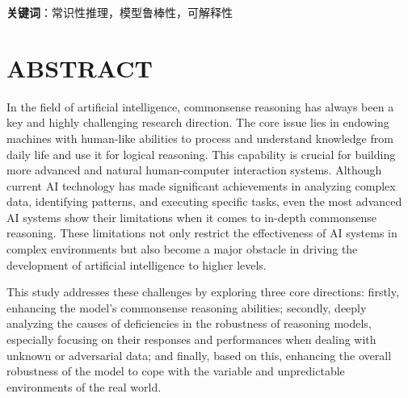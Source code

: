 \documentclass[UTF8,a4paper,12pt]{ctexart}
\numberwithin{equation}{section}
\begin{document}
\textbf{关键词}：常识性推理，模型鲁棒性，可解释性\\

\newpage


\section*{ABSTRACT}

\hspace{8mm}
In the field of artificial intelligence, commonsense reasoning has always been a key and highly challenging research direction. The core issue lies in endowing machines with human-like abilities to process and understand knowledge from daily life and use it for logical reasoning. This capability is crucial for building more advanced and natural human-computer interaction systems. Although current AI technology has made significant achievements in analyzing complex data, identifying patterns, and executing specific tasks, even the most advanced AI systems show their limitations when it comes to in-depth commonsense reasoning. These limitations not only restrict the effectiveness of AI systems in complex environments but also become a major obstacle in driving the development of artificial intelligence to higher levels.

This study addresses these challenges by exploring three core directions: firstly, enhancing the model's commonsense reasoning abilities; secondly, deeply analyzing the causes of deficiencies in the robustness of reasoning models, especially focusing on their responses and performances when dealing with unknown or adversarial data; and finally, based on this, enhancing the overall robustness of the model to cope with the variable and unpredictable environments of the real world.
\end{document}
